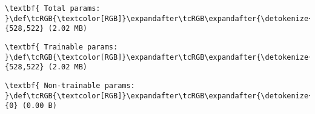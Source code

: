 \documentclass[11pt]{article}
\begin{document}
    
    
    \begin{Verbatim}[commandchars=\\\{\}]
\textbf{ Total params: }\def\tcRGB{\textcolor[RGB]}\expandafter\tcRGB\expandafter{\detokenize{0,175,0}}{528,522} (2.02 MB)

    \end{Verbatim}

    
    
    \begin{Verbatim}[commandchars=\\\{\}]
\textbf{ Trainable params: }\def\tcRGB{\textcolor[RGB]}\expandafter\tcRGB\expandafter{\detokenize{0,175,0}}{528,522} (2.02 MB)

    \end{Verbatim}

    
    
    \begin{Verbatim}[commandchars=\\\{\}]
\textbf{ Non-trainable params: }\def\tcRGB{\textcolor[RGB]}\expandafter\tcRGB\expandafter{\detokenize{0,175,0}}{0} (0.00 B)

    \end{Verbatim}
\end{document}
